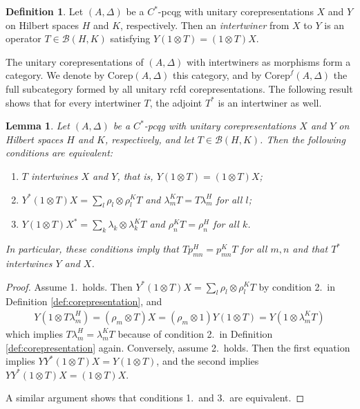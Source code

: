 \documentclass[11pt]{article}
\newcommand{\Corep}{\mathrm{Corep}}
\newcommand{\Corepf}{\mathrm{Corep}^{f}}
\newtheorem{Lem}[Theorem]{Lemma}
\theoremstyle{definition}
\newtheorem{Def}[Theorem]{Definition}
\numberwithin{equation}{section}
\begin{document}
\begin{Def} \label{def:intertwiner}
  Let $(A,\Delta)$ be a $C^{*}$-pcqg with unitary corepresentations $X$ and $Y$ on Hilbert spaces
  $H$ and $K$, respectively.  Then an \emph{intertwiner} from $X$ to $Y$ is an operator $T\in
  \mathcal{B}(H,K)$ satisfying   $Y(1\otimes T)=(1 \otimes T)X$.
\end{Def}
The unitary corepresentations of $(A,\Delta)$ with intertwiners as morphisms form a category.  We
denote by $\Corep(A,\Delta)$ this category, and by $\Corepf(A,\Delta)$ the full subcategory formed
by all unitary rcfd corepresentations. The following result shows that for every intertwiner $T$,
the adjoint $T^{*}$ is an intertwiner as well.
\begin{Lem} \label{lem:def-intertwiner}
  Let $(A,\Delta)$ be a $C^{*}$-pcqg with unitary corepresentations $X$ and $Y$ on Hilbert spaces
  $H$ and $K$, respectively, and let $T\in \mathcal{B}(H,K)$. Then the following conditions are equivalent:
  \begin{enumerate}
  \item $T$ intertwines $X$ and $Y$, that is, $Y(1\otimes T)=(1 \otimes T)X$;
  \item $Y^{*}(1\otimes T)X=\sum_{l} \rho_{l} \otimes \rho^{K}_{l}T$ and $\lambda_{m}^{K}T=T\lambda_{m}^{H}$ for all $l$;
  \item $Y(1\otimes T)X^{*} = \sum_{k} \lambda_{k} \otimes \lambda^{K}_{k}T$ and
    $\rho_{n}^{K}T=\rho_{n}^{H}$ for all $k$.
  \end{enumerate}
  In particular,  these conditions imply that $Tp_{mn}^{H}=p_{mn}^{K}T$ for all $m,n$ and that
  $T^{*}$ intertwines $Y$ and $X$.
\end{Lem}
\begin{proof}
  Assume 1.\ holds. Then $Y^{*}(1\otimes T)X=\sum_{l} \rho_{l} \otimes \rho^{K}_{l}T$ by condition
  2.\ in Definition \ref{def:corepresentation}, and
  \begin{align*}
    Y(1\otimes T\lambda^{H}_{m}) = (\rho_{m} \otimes T)X = (\rho_{m} \otimes 1)Y(1\otimes T) =
    Y(1\otimes \lambda^{K}_{m}T)
  \end{align*}
which implies $T\lambda^{H}_{m} = \lambda^{K}_{m}T$ because of  condition
  2.\ in Definition \ref{def:corepresentation} again. 
Conversely, assume 2.\ holds. Then the first equation implies $YY^{*}(1\otimes T)X = Y(1\otimes T)$,
and the second implies $YY^{*}(1\otimes T)X=(1\otimes T)X$.

 A similar argument shows that conditions 1.\ and 3.\ are equivalent.
\end{proof}
\end{document}
